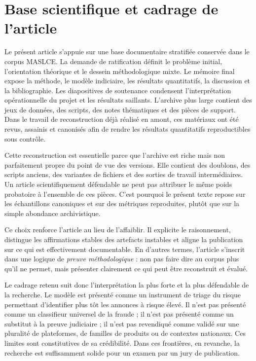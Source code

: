 \documentclass[10pt,a4paper]{article}
\begin{document}
\section{Base scientifique et cadrage de l'article}
Le présent article s'appuie sur une base documentaire stratifiée conservée dans le corpus MASLCE. La demande de ratification définit le problème initial, l'orientation théorique et le dessein méthodologique mixte. Le mémoire final expose la méthode, le modèle indiciaire, les résultats quantitatifs, la discussion et la bibliographie. Les diapositives de soutenance condensent l'interprétation opérationnelle du projet et les résultats saillants. L'archive plus large contient des jeux de données, des scripts, des notes thématiques et des pièces de support. Dans le travail de reconstruction déjà réalisé en amont, ces matériaux ont été revus, assainis et canonisés afin de rendre les résultats quantitatifs reproductibles sous contrôle.

Cette reconstruction est essentielle parce que l'archive est riche mais non parfaitement propre du point de vue des versions. Elle contient des doublons, des scripts anciens, des variantes de fichiers et des sorties de travail intermédiaires. Un article scientifiquement défendable ne peut pas attribuer le même poids probatoire à l'ensemble de ces pièces. C'est pourquoi le présent texte repose sur les échantillons canoniques et sur des métriques reproduites, plutôt que sur la simple abondance archivistique.

Ce choix renforce l'article au lieu de l'affaiblir. Il explicite le raisonnement, distingue les affirmations stables des artefacts instables et aligne la publication sur ce qui est effectivement documentable. En d'autres termes, l'article s'inscrit dans une logique de \emph{preuve méthodologique} : non pas faire dire au corpus plus qu'il ne permet, mais présenter clairement ce qui peut être reconstruit et évalué.

Le cadrage retenu suit donc l'interprétation la plus forte et la plus défendable de la recherche. Le modèle est présenté comme un instrument de triage du risque permettant d'identifier plus tôt les annonces à risque élevé. Il n'est pas présenté comme un classifieur universel de la fraude ; il n'est pas présenté comme un substitut à la preuve judiciaire ; il n'est pas revendiqué comme validé sur une pluralité de plateformes, de familles de produits ou de contextes nationaux. Ces limites sont constitutives de sa crédibilité. Dans ces frontières, en revanche, la recherche est suffisamment solide pour un examen par un jury de publication.
\end{document}
